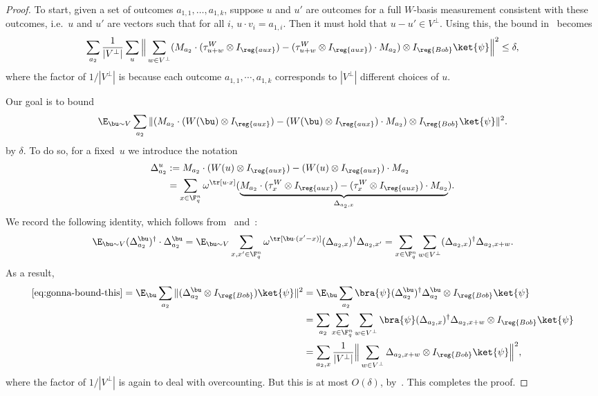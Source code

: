 \begin{proof}
To start, given a set of outcomes $a_{1,1}, \dots, a_{1,k}$, suppose
$u$ and $u'$ are outcomes for a full $W$-basis measurement consistent with
these outcomes, i.e.\ $u$ and $u'$ are vectors such that for all $i$, $u \cdot
v_i = a_{1,i}$. Then it must hold that $u - u' \in V^\perp$. Using
this, the bound in~ becomes
\begin{equation}\label{eq:m-commutes-subspace-proj2}
  \sum_{a_2} \frac{1}{|V^\perp|} \sum_{u} \Big\| \sum_{w \in V^\perp} (M_{a_2} \cdot
  (\tau^W_{u+w} \otimes I_{\reg{aux}}) - (\tau^{W}_{u+w} \otimes I_{\reg{aux}}) \cdot M_{a_2}) \otimes I_{\reg{Bob}} \ket{\psi}\Big\|^2 \leq \delta,
\end{equation}
where the factor of $1/|V^\perp|$ is because each outcome $a_{1,1},
\cdots, a_{1,k}$ corresponds to $|V^\perp|$ different choices of $u$.
  
Our goal is to bound
\begin{equation}\label{eq:gonna-bound-this}
\E_{\bu\sim V} \sum_{a_2} \Vert (M_{a_2} \cdot (W(\bu)\otimes I_{\reg{aux}}) - (W(\bu)\otimes I_{\reg{aux}}) \cdot M_{a_2}) \otimes I_{\reg{Bob}} \ket{\psi} \Vert^2.
\end{equation}
by $\delta$.
To do so, for a fixed~$u$ we introduce the notation
\begin{align}
\Delta_{a_2}^{u}
&:= M_{a_2} \cdot (W(u) \otimes I_{\reg{aux}})- (W(u)\otimes I_{\reg{aux}}) \cdot M_{a_2}\\
&= \sum_{x \in \F_q^n} \omega^{\tr[u \cdot x]} (\underbrace{M_{a_2} \cdot (\tau^{W}_{x} \otimes I_{\reg{aux}})
	- (\tau^{W}_{x} \otimes I_{\reg{aux}}) \cdot M_{a_2}}_{\Delta_{a_2,x}}).\label{eq:pauli-obs-commutator}
\end{align}
We record the following identity, which follows
from~ and~:
\begin{equation*}
\E_{\bu \sim V } (\Delta_{a_2}^{\bu})^\dagger\cdot \Delta_{a_2}^{\bu}
= \E_{\bu \sim V} \sum_{x, x' \in \F_q^n} \omega^{\tr[\bu \cdot (x' - x)]} (\Delta_{a_2,x})^\dagger \Delta_{a_2,x'}
= \sum_{x \in \F_q^n} \sum_{w \in V^\perp} (\Delta_{a_2,x})^\dagger \Delta_{a_2,x+w}.
\end{equation*}
As a result,
\begin{align*}
\eqref{eq:gonna-bound-this}=
\E_{\bu} \sum_{a_2}\Vert (\Delta_{a_2}^{\bu} \otimes I_{\reg{Bob}}) \ket{\psi}\Vert^2
&= \E_{\bu} \sum_{a_2} \bra{\psi} (\Delta_{a_2}^{\bu})^\dagger \Delta_{a_2}^{\bu} \otimes I_{\reg{Bob}} \ket{\psi}\\
&=  \sum_{a_2} \sum_{x \in \F_q^n} \sum_{ w\in V^\perp} \bra{\psi}(\Delta_{a_2,x})^\dagger \Delta_{a_2,x+w} \otimes I_{\reg{Bob}} \ket{\psi}\\
&= \sum_{a_2, x} \frac{1}{|V^\perp|} \Big\| \sum_{w \in V^\perp} \Delta_{a_2,x+w} \otimes I_{\reg{Bob}} \ket{\psi} \Big\|^2,
\end{align*}
where the factor of $1/|V^\perp|$ is again to deal with overcounting. But this is at most $O(\delta)$, by~. This completes the proof.
\end{proof}

